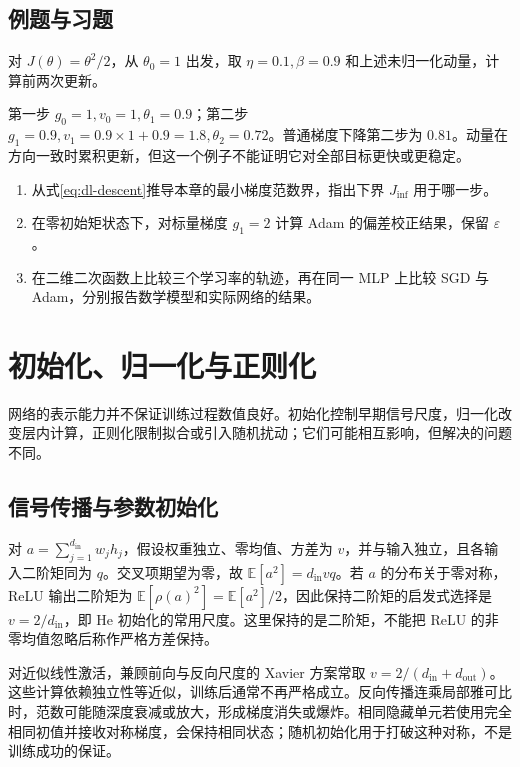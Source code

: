 \documentclass[UTF8,12pt,a4paper,fontset=fandol]{ctexbook}
\begin{document}
\section{例题与习题}
\begin{example}[动量累积与步长]
对 $J(\theta)=\theta^2/2$，从 $\theta_0=1$ 出发，取 $\eta=0.1,\beta=0.9$ 和上述未归一化动量，计算前两次更新。
\end{example}
\begin{solve}
第一步 $g_0=1,v_0=1,\theta_1=0.9$；第二步 $g_1=0.9,v_1=0.9\times1+0.9=1.8,\theta_2=0.72$。普通梯度下降第二步为 $0.81$。动量在方向一致时累积更新，但这一个例子不能证明它对全部目标更快或更稳定。
\end{solve}
\begin{enumerate}
\item 从式\eqref{eq:dl-descent}推导本章的最小梯度范数界，指出下界 $J_{\inf}$ 用于哪一步。
\item 在零初始矩状态下，对标量梯度 $g_1=2$ 计算 Adam 的偏差校正结果，保留 $\varepsilon$。
\item 在二维二次函数上比较三个学习率的轨迹，再在同一 MLP 上比较 SGD 与 Adam，分别报告数学模型和实际网络的结果。
\end{enumerate}

\chapter{初始化、归一化与正则化}
\label{chap:dl-regularization}
网络的表示能力并不保证训练过程数值良好。初始化控制早期信号尺度，归一化改变层内计算，正则化限制拟合或引入随机扰动；它们可能相互影响，但解决的问题不同。

\section{信号传播与参数初始化}
对 $a=\sum_{j=1}^{d_{\mathrm{in}}}w_jh_j$，假设权重独立、零均值、方差为 $v$，并与输入独立，且各输入二阶矩同为 $q$。交叉项期望为零，故 $\mathbb E[a^2]=d_{\mathrm{in}}vq$。若 $a$ 的分布关于零对称，ReLU 输出二阶矩为 $\mathbb E[\rho(a)^2]=\mathbb E[a^2]/2$，因此保持二阶矩的启发式选择是 $v=2/d_{\mathrm{in}}$，即 He 初始化的常用尺度。这里保持的是二阶矩，不能把 ReLU 的非零均值忽略后称作严格方差保持。

对近似线性激活，兼顾前向与反向尺度的 Xavier 方案常取 $v=2/(d_{\mathrm{in}}+d_{\mathrm{out}})$。这些计算依赖独立性等近似，训练后通常不再严格成立。反向传播连乘局部雅可比时，范数可能随深度衰减或放大，形成梯度消失或爆炸。相同隐藏单元若使用完全相同初值并接收对称梯度，会保持相同状态；随机初始化用于打破这种对称，不是训练成功的保证。
\end{document}
